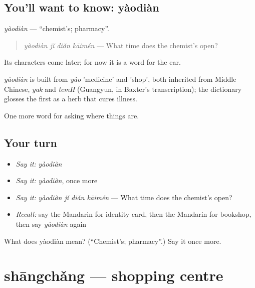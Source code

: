 \subsection*{You'll want to know: yàodiàn}
\emph{yàodiàn} — \textquotedblleft{}chemist's; pharmacy\textquotedblright{}.

\begin{quote}
\emph{yàodiàn jǐ diǎn kāimén} — What time does the chemist's open?
\end{quote}

Its characters come later; for now it is a word for the ear.

\begin{cousinweb}
\emph{yàodiàn} is built from \emph{yào} 'medicine' and  'shop', both inherited from Middle Chinese, \emph{yak} and \emph{temH} (Guangyun, in Baxter's transcription); the dictionary glosses the first as a herb that cures illness.
\end{cousinweb}

\begin{grammarlens}[title={What you've built}]
One more word for asking where things are.
\end{grammarlens}

\subsection*{Your turn}
\begin{itemize}
\raggedright
  \item \emph{Say it:} \emph{yàodiàn}
  \item \emph{Say it:} \emph{yàodiàn}, once more
  \item \emph{Say it:} \emph{yàodiàn jǐ diǎn kāimén} — What time does the chemist's open?
  \item \emph{Recall:} say the Mandarin for identity card, then the Mandarin for bookshop, then say \emph{yàodiàn} again
\end{itemize}

\begin{tcolorbox}[breakable,colback=teal!4,colframe=teal!35!black,title={Before you move on}]
What does yàodiàn mean? (\textquotedblleft{}Chemist's; pharmacy\textquotedblright{}.) Say it once more.
\end{tcolorbox}
\section[shāngchǎng]{shāngchǎng — shopping centre}

